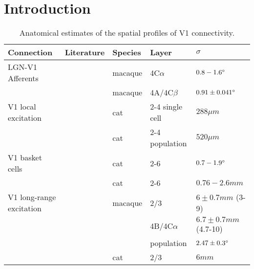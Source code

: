 \documentclass[12pt]{article}
\begin{document}
\section{Introduction}
\begin{table}
  \centering
  \begin{tabular}{l | l l l l}
    Connection               & Literature            & Species & Layer & $\sigma$ \\
    \hline
    LGN-V1 Afferents         & \cite{Angelucci2002c} & macaque & 4C$\alpha$ & $0.8-1.6\degree$ \\ 
                             & \cite{Angelucci2006a} & macaque & 4A/4C$\beta$ & $0.91 \pm 0.041 \degree$ \\
    \hline
    V1 local excitation      & \cite{Buzas2006}      & cat      & 2-4 single cell & $288 \mu m$ \\
                             & \cite{Buzas2006}      & cat      & 2-4 population  & $520 \mu m$ \\
    \hline
    V1 basket cells          & \cite{Buzas2001}      & cat      & 2-6 & $0.7-1.9 \degree$ \\
                             & \cite{Buzas2001}      & cat      & 2-6 & $0.76-2.6 mm$ \\
    \hline
    V1 long-range excitation & \cite{Angelucci2002}  & macaque  & 2/3 & $6\pm 0.7 mm$ (3-9) \\
                             &                       &          & 4B/4C$\alpha$ & $6.7 \pm 0.7 mm$ (4.7-10) \\
                             &                       &          & population & $2.47 \pm 0.3 \degree$ \\
                             & \cite{Buzas2006}      & cat      & 2/3 & $6 mm$ \\
    \hline
  \end{tabular}
  \caption[]%
          {Anatomical estimates of the spatial profiles of V1 connectivity.}
  \label{anatomicaltable}
\end{table}
\end{document}
